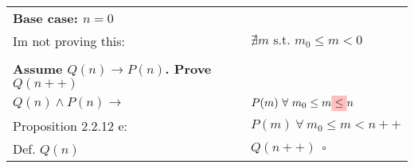 \documentclass[letterpaper]{article}
\begin{document}
\begin{center}
	\begin{tabular}{l l}
		\textbf{Base case: $n = 0$} \\
		Im not proving this:   & $\nexists m \text{ s.t. } m_0 \leq m < 0$ \\
		\\
		\textbf{Assume $Q(n) \to P(n)$. Prove $Q(n++)$} \\
		$Q(n) \land P(n) \to$  & $P(m)~ \forall~ m_0 \leq m \colorbox{pink}{$\leq$} n$ \\
		Proposition 2.2.12 e:  & $P(m)~ \forall~ m_0 \leq m < n++$ \\
		Def. $Q(n)$            & $Q(n++)~~ \square$
	\end{tabular}
\end{center}
\end{document}
